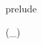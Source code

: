 \begin{zsection}
\SECTION prelude
\end{zsection}
\begin{zed}
\generic (\power \_)
\end{zed}
\begin{zed}
[\arithmos]
\end{zed}

